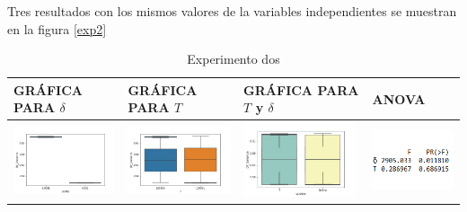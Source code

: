 Tres resultados con los mismos valores de la variables independientes se muestran en la figura \ref{exp2}

\begin{table}[h]
\caption{Experimento dos}
\centering
\begin{tabular}[c]{llll}
\multicolumn{1}{p{2.9cm}}{\textbf{GRÁFICA PARA $\delta$}} & \multicolumn{1}{p{2.9cm}}{\textbf{GRÁFICA PARA $T$}} & \multicolumn{1}{p{2.9cm}}{\textbf{GRÁFICA PARA $T$ y $\delta$}} & \multicolumn{1}{p{2.9cm}}{\textbf{ANOVA}}  \\ \hline
\multicolumn{1}{|l|}{\includegraphics[align=t, width=33mm]{cajasDeltha_exp21.jpg}}    & \multicolumn{1}{l|}{\includegraphics[align=t, width=33mm]{cajasT1_exp21.jpg} } & \multicolumn{1}{l|}{\includegraphics[align=t, width=33mm]{cajasT_Deltha_exp21.jpg} } &
\multicolumn{1}{p{3cm}|}{\includegraphics[align=t, width=30mm]{Anova21.png}}     \\ \hline

\end{tabular}
\end{table}
